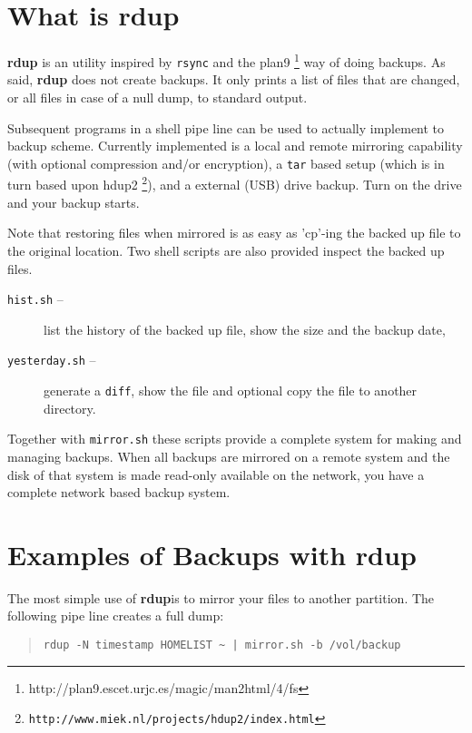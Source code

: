 \documentclass{article}
\newcommand{\rdup}{\textbf{rdup}}
\newcommand{\cmd}[1]{\texttt{#1}}
\newcommand{\url}[1]{\texttt{#1}}
\begin{document}
\section{What is \rdup}
\rdup{} is an utility inspired by \cmd{rsync} and the 
plan9 \footnote{http://plan9.escet.urjc.es/magic/man2html/4/fs} 
way of doing backups. As said, \rdup{} does not create backups. It only
prints a list of files that are changed, or all files in case of a null
dump, to standard output.

Subsequent programs in a shell pipe line can be used to actually
implement to backup scheme. Currently implemented is a local and
remote mirroring capability (with optional compression and/or
encryption), a \cmd{tar} based setup (which is in turn based upon
hdup2 \footnote{\url{http://www.miek.nl/projects/hdup2/index.html}}), 
and a external (USB) drive backup. Turn on the drive and your backup starts.

Note that restoring files when mirrored is as easy as 'cp'-ing the
backed up file to the original location. Two shell scripts are
also provided inspect the backed up files. 
\begin{description}
        \item[\cmd{hist.sh} --]{
                list the history of the backed up file, show the size
                and the backup date,}
        \item[\cmd{yesterday.sh} --]{
                generate a \cmd{diff}, show the file and optional copy 
                the file to another directory.}
\end{description}

Together with \cmd{mirror.sh} these scripts provide a complete system
for making and managing backups. When all backups are mirrored on a
remote system and the disk of that system is made read-only available on 
the network, you have a complete network based backup system.

\section{Examples of Backups with rdup}
The most simple use of \rdup is to mirror your files to
another partition. The following pipe line creates a
full dump:
\begin{quote}
\begin{verbatim}
rdup -N timestamp HOMELIST ~ | mirror.sh -b /vol/backup
\end{verbatim}
\end{quote}
\end{document}

